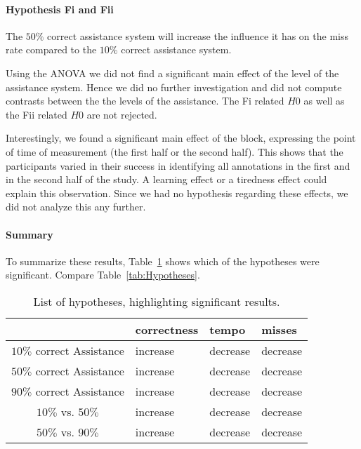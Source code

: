 	\paragraph{Hypothesis Fi and Fii}
	\lqq The \(50\%\) correct assistance system will increase the influence it has on the miss rate compared to the \(10\%\) correct assistance system.\rqq

	Using the \ac{ANOVA} we did not find a significant main effect of the level of the assistance system. Hence we did no further investigation and did not compute contrasts between the the levels of the assistance. The Fi related $H0$ as well as the Fii related $H0$ are not rejected.

	Interestingly, we found a significant main effect of the block, expressing the point of time of measurement (the first half or the second half). This shows that the participants varied in their success in identifying all annotations in the first and in the second half of the study. A learning effect or a tiredness effect could explain this observation. Since we had no hypothesis regarding these effects, we did not analyze this any further.


	\paragraph{Summary}
	To summarize these results, Table~\ref{tab:DiscussionHypothesesWithResults} shows which of the hypotheses were significant. Compare Table~\ref{tab:Hypotheses}.

	\begin{table}\centering
		\caption{List of hypotheses, highlighting significant results.}
		\begin{tabular}{clll}
			\toprule
			& correctness & tempo & misses \\
			\midrule
			$10\%$ correct Assistance & increase \XSolidBrush & decrease \XSolidBrush & decrease \XSolidBrush \\
			$50\%$ correct Assistance & \cellcolor{HighlightGreen}increase \Checkmark & \cellcolor{HighlightGreen}decrease \Checkmark & \cellcolor{HighlightGreen}decrease \Checkmark \\
			$90\%$ correct Assistance & \cellcolor{HighlightGreen}increase \Checkmark & \cellcolor{HighlightGreen}decrease \Checkmark & \cellcolor{HighlightGreen}decrease \Checkmark \\
			$10\%$ vs. $50\%$ & increase \XSolidBrush & decrease \XSolidBrush & decrease \XSolidBrush \\
			$50\%$ vs. $90\%$ & increase \XSolidBrush & decrease \XSolidBrush & decrease \XSolidBrush \\
			\bottomrule
		\end{tabular}
		\label{tab:DiscussionHypothesesWithResults}
	\end{table}



